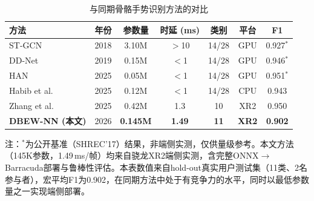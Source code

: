 \begin{table}[htbp]
  \centering
  \caption{与同期骨骼手势识别方法的对比}
  \label{tab:cross_method_comparison}
  \small
  \setlength{\tabcolsep}{8pt}
  \begin{tabular}{lcccccc}
  \hline
  方法 & 年份 & 参数量 & 时延 (ms) & 类别 & 平台 & F1 \\
  \hline
  ST-GCN \cite{yan2018stgcn} & 2018 & 3.10M & ${>}$10 & 14/28 & GPU & 0.927$^*$ \\
  DD-Net \cite{yang2019ddnet} & 2019 & 0.15M & ${<}$1 & 14/28 & GPU & 0.946$^*$ \\
  HAN \cite{han2025hierarchical_attention} & 2025 & 0.05M & ${<}$1 & 14/28 & GPU & 0.951$^*$ \\
  Habib et al.\ \cite{habib2025skeleton_hgr} & 2025 & 0.12M & ${<}$1 & 14/28 & CPU & 0.943 \\
  Zhang et al.\ \cite{openxr2025gesture} & 2025 & 0.42M & 1.3 & 10 & XR2 & 0.950 \\
  \hline
  \textbf{DBEW-NN (本文)} & 2026 & \textbf{0.145M} & \textbf{1.49} & \textbf{11} & \textbf{XR2} & \textbf{0.902} \\
  \hline
  \end{tabular}
  \noindent\begin{minipage}{\linewidth}\footnotesize
  注：$^*$为公开基准（SHREC'17）结果，非端侧实测，仅供量级参考。本文方法（145K参数，1.49\,ms/帧）均来自骁龙XR2端侧实测，含完整ONNX$\rightarrow$Barracuda部署与鲁棒性评估。本表数值来自hold-out真实用户测试集（11类、2名参与者），宏平均F1为0.902，在同期方法中处于有竞争力的水平，同时以最低参数量之一实现端侧部署。
  \end{minipage}
\end{table}
